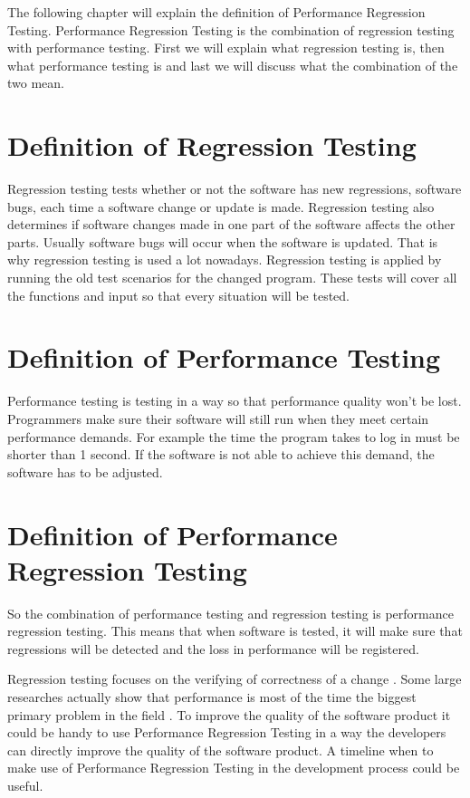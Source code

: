The following chapter will explain the definition of Performance Regression Testing. Performance Regression Testing is the combination of regression testing with performance testing. First we will explain what regression testing is, then what performance testing is and last we will discuss what the combination of the two mean.

\section{Definition of Regression Testing} 
Regression testing tests whether or not the software has new regressions, software bugs, each time a software change or update is made. Regression testing also determines if software changes made in one part of the software affects the other parts. Usually software bugs will occur when the software is updated. That is why regression testing is used a lot nowadays. Regression testing is applied by running the old test scenarios for the changed program. These tests will cover all the functions and input so that every situation will be tested.

\section{Definition of Performance Testing}
Performance testing is testing in a way so that performance quality won't be lost. Programmers make sure their software will still run when they meet certain performance demands. For example the time the program takes to log in must be shorter than 1 second. If the software is not able to achieve this demand, the software has to be adjusted.

\section{Definition of Performance Regression Testing}
So the combination of performance testing and regression testing is performance regression testing. This means that when software is tested, it will make sure that regressions will be detected and the loss in performance will be registered.

Regression testing focuses on the verifying of correctness of a change \cite{detection_performance_regressions}. Some large researches actually show that performance is most of the time the biggest primary problem in the field \cite{Mining_PRT_Automated}. \newline To improve the quality of the software product it could be handy to use Performance Regression Testing in a way the developers can directly improve the quality of the software product. A timeline when to make use of Performance Regression Testing in the development process could be useful.  